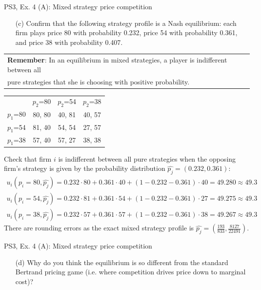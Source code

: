 \begin{frame}{PS3, Ex. 4 (A): Mixed strategy price competition}
    \begin{itemize}
      \item[(c)] Confirm that the following strategy profile is a Nash equilibrium: each firm plays price 80 with probability 0.232, price 54 with probability 0.361, and price 38 with probability 0.407.
    \end{itemize}
    \begin{tabular}{|l|}
      \cline{1-1}
      \textbf{Remember}: In an equilibrium in mixed strategies, a player is indifferent between all \\
      pure strategies that she is choosing with positive probability.\\\cline{1-1}
    \end{tabular}
    \begin{table}
      \begin{tabular}{c|c|c|c|}
        \multicolumn{1}{c}{} & \multicolumn{1}{c}{$p_2$=80} & \multicolumn{1}{c}{$p_2$=54} & \multicolumn{1}{c}{$p_2$=38} \\\cline{2-4}
        $p_1$=80 & 80, 80 & 40, 81 & 40, 57 \\\cline{2-4}
        $p_1$=54 & 81, 40 & 54, 54 & 27, 57 \\\cline{2-4}
        $p_1$=38 & 57, 40 & 57, 27 & 38, 38 \\\cline{2-4}
      \end{tabular}
    \end{table}
    Check that firm $i$ is indifferent between all pure strategies when the opposing firm's strategy is given by the probability distribution $\widehat{p_j}=(0.232,0.361)$:
    \begin{align*}
      u_i(p_i=80,\widehat{p_j})= 0.232\cdot80 + 0.361\cdot40 + (1-0.232-0.361)\cdot40 = 49.280 \approx 49.3\\
      u_i(p_i=54,\widehat{p_j})= 0.232\cdot81 + 0.361\cdot54 + (1-0.232-0.361)\cdot27 = 49.275 \approx 49.3\\
      u_i(p_i=38,\widehat{p_j})= 0.232\cdot57 + 0.361\cdot57 + (1-0.232-0.361)\cdot38 = 49.267 \approx 49.3
    \end{align*}
    There are rounding errors as the exact mixed strategy profile is $\widehat{p_j}=\left(\frac{193}{833},\frac{8127}{22491}\right)$.
  \vfill\null
\end{frame}
\begin{frame}{PS3, Ex. 4 (A): Mixed strategy price competition}
    \begin{itemize}
      \item[(d)] Why do you think the equilibrium is so different from the standard Bertrand pricing game (i.e. where competition drives price down to marginal cost)?
    \end{itemize}
  \vfill\null
\end{frame}

